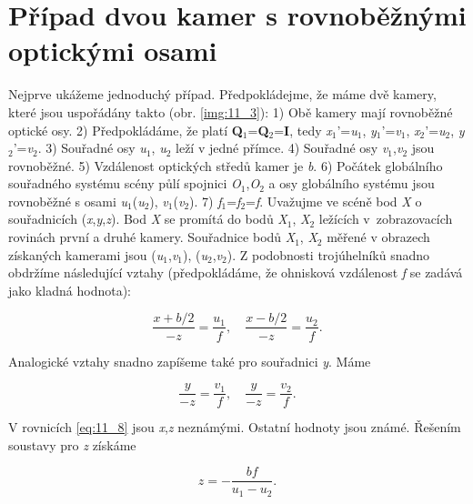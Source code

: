 \section*{Případ dvou kamer s rovnoběžnými optickými osami} \label{sec:rovnobezne_kamery}

Nejprve ukážeme jednoduchý případ. Předpokládejme, že máme dvě kamery, které jsou uspořádány takto (obr. \ref{img:11_3}): 1) Obě kamery mají rovnoběžné optické osy. 2) Předpokládáme, že platí \textbf{Q}$_1$=\textbf{Q}$_2$=\textbf{I}, tedy \textit{x}$_1$'=\textit{u}$_1$, \textit{y}$_1$'=\textit{v}$_1$, \textit{x}$_2$'=\textit{u}$_2$, \textit{y}$_2$'=\textit{v}$_2$. 3) Souřadné osy \textit{u}$_1$, \textit{u}$_2$ leží v jedné přímce. 4) Souřadné osy \textit{v}$_1$,\textit{v}$_2$ jsou rovnoběžné. 5) Vzdálenost optických středů kamer je \textit{b}. 6) Počátek globálního souřadného systému scény půlí spojnici \textit{O}$_1$,\textit{O}$_2$ a osy globálního systému jsou rovnoběžné s osami \textit{u}$_1$(\textit{u}$_2$), \textit{v}$_1$(\textit{v}$_2$). 7)  \textit{f}$_1$=\textit{f}$_2$=\textit{f}. Uvažujme ve scéně bod \textit{X} o souřadnicích (\textit{x},\textit{y},\textit{z}). Bod \textit{X} se promítá do bodů \textit{X}$_1$, \textit{X}$_2$ ležících v~zobrazovacích rovinách první a druhé kamery. Souřadnice bodů \textit{X}$_1$, \textit{X}$_2$ měřené v obrazech získaných kamerami jsou (\textit{u}$_1$,\textit{v}$_1$), (\textit{u}$_2$,\textit{v}$_2$). Z podobnosti trojúhelníků snadno obdržíme následující vztahy (předpokládáme, že ohnisková vzdálenost \textit{f} se zadává jako kladná hodnota):

\begin{equation} \label{eq:11_8}
    \frac{x + b/2}{-z} = \frac{u_1}{f}, \quad \frac{x - b/2}{-z} = \frac{u_2}{f}.
\end{equation}

Analogické vztahy snadno zapíšeme také pro souřadnici \textit{y}. Máme

\begin{equation} \label{eq:11_9}
    \frac{y}{-z} = \frac{v_1}{f}, \quad \frac{y}{-z} = \frac{v_2}{f}.
\end{equation}

V rovnicích \eqref{eq:11_8} jsou \textit{x},\textit{z} neznámými. Ostatní hodnoty jsou známé. Řešením soustavy pro \textit{z} získáme

\begin{equation} \label{eq:11_10}
    z = - \frac{bf}{u_1 - u_2}.
\end{equation}

